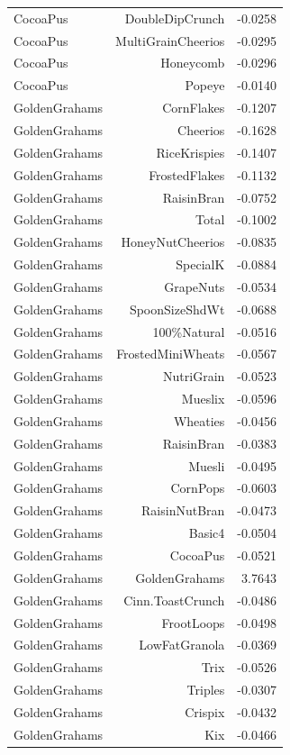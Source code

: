 \begin{longtable}{@{}lrr@{}}
CocoaPus & DoubleDipCrunch & -0.0258 \\
CocoaPus & MultiGrainCheerios & -0.0295 \\
CocoaPus & Honeycomb & -0.0296 \\
CocoaPus & Popeye & -0.0140 \\
GoldenGrahams & CornFlakes & -0.1207 \\
GoldenGrahams & Cheerios & -0.1628 \\
GoldenGrahams & RiceKrispies & -0.1407 \\
GoldenGrahams & FrostedFlakes & -0.1132 \\
GoldenGrahams & RaisinBran & -0.0752 \\
GoldenGrahams & Total & -0.1002 \\
GoldenGrahams & HoneyNutCheerios & -0.0835 \\
GoldenGrahams & SpecialK & -0.0884 \\
GoldenGrahams & GrapeNuts & -0.0534 \\
GoldenGrahams & SpoonSizeShdWt & -0.0688 \\
GoldenGrahams & 100\%Natural & -0.0516 \\
GoldenGrahams & FrostedMiniWheats & -0.0567 \\
GoldenGrahams & NutriGrain & -0.0523 \\
GoldenGrahams & Mueslix & -0.0596 \\
GoldenGrahams & Wheaties & -0.0456 \\
GoldenGrahams & RaisinBran & -0.0383 \\
GoldenGrahams & Muesli & -0.0495 \\
GoldenGrahams & CornPops & -0.0603 \\
GoldenGrahams & RaisinNutBran & -0.0473 \\
GoldenGrahams & Basic4 & -0.0504 \\
GoldenGrahams & CocoaPus & -0.0521 \\
GoldenGrahams & GoldenGrahams & 3.7643 \\
GoldenGrahams & Cinn.ToastCrunch & -0.0486 \\
GoldenGrahams & FrootLoops & -0.0498 \\
GoldenGrahams & LowFatGranola & -0.0369 \\
GoldenGrahams & Trix & -0.0526 \\
GoldenGrahams & Triples & -0.0307 \\
GoldenGrahams & Crispix & -0.0432 \\
GoldenGrahams & Kix & -0.0466 \\

\end{longtable}
